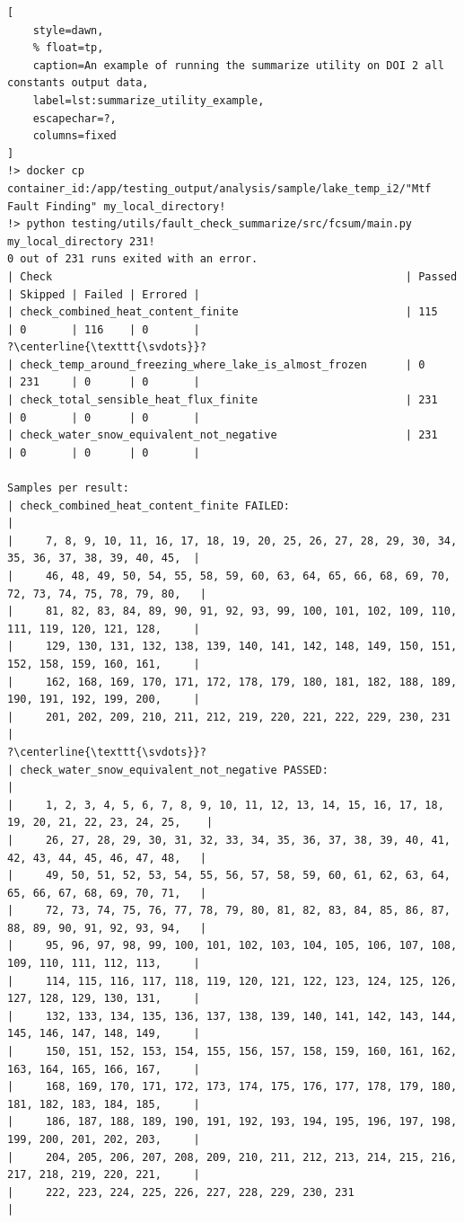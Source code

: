 \documentclass[10pt]{article}
\DeclareRobustCommand{\svdots}{%
  \vbox{
    \baselineskip=0.33333\normalbaselineskip
    \lineskiplimit=0pt
    \hbox{.}\hbox{.}\hbox{.}
    \kern-0.2\baselineskip
  }
}
\begin{document}
\begin{lstlisting}[
    style=dawn,
    % float=tp,
    caption=An example of running the summarize utility on DOI 2 all constants output data,
    label=lst:summarize_utility_example,
    escapechar=?,
    columns=fixed
]
!> docker cp container_id:/app/testing_output/analysis/sample/lake_temp_i2/"Mtf Fault Finding" my_local_directory!
!> python testing/utils/fault_check_summarize/src/fcsum/main.py my_local_directory 231!
0 out of 231 runs exited with an error.
| Check                                                       | Passed | Skipped | Failed | Errored |
| check_combined_heat_content_finite                          | 115    | 0       | 116    | 0       |
?\centerline{\texttt{\svdots}}?
| check_temp_around_freezing_where_lake_is_almost_frozen      | 0      | 231     | 0      | 0       |
| check_total_sensible_heat_flux_finite                       | 231    | 0       | 0      | 0       |
| check_water_snow_equivalent_not_negative                    | 231    | 0       | 0      | 0       |

Samples per result:
| check_combined_heat_content_finite FAILED:                                                        |
|     7, 8, 9, 10, 11, 16, 17, 18, 19, 20, 25, 26, 27, 28, 29, 30, 34, 35, 36, 37, 38, 39, 40, 45,  |
|     46, 48, 49, 50, 54, 55, 58, 59, 60, 63, 64, 65, 66, 68, 69, 70, 72, 73, 74, 75, 78, 79, 80,   |
|     81, 82, 83, 84, 89, 90, 91, 92, 93, 99, 100, 101, 102, 109, 110, 111, 119, 120, 121, 128,     |
|     129, 130, 131, 132, 138, 139, 140, 141, 142, 148, 149, 150, 151, 152, 158, 159, 160, 161,     |
|     162, 168, 169, 170, 171, 172, 178, 179, 180, 181, 182, 188, 189, 190, 191, 192, 199, 200,     |
|     201, 202, 209, 210, 211, 212, 219, 220, 221, 222, 229, 230, 231                               |
?\centerline{\texttt{\svdots}}?
| check_water_snow_equivalent_not_negative PASSED:                                                  |
|     1, 2, 3, 4, 5, 6, 7, 8, 9, 10, 11, 12, 13, 14, 15, 16, 17, 18, 19, 20, 21, 22, 23, 24, 25,    |
|     26, 27, 28, 29, 30, 31, 32, 33, 34, 35, 36, 37, 38, 39, 40, 41, 42, 43, 44, 45, 46, 47, 48,   |
|     49, 50, 51, 52, 53, 54, 55, 56, 57, 58, 59, 60, 61, 62, 63, 64, 65, 66, 67, 68, 69, 70, 71,   |
|     72, 73, 74, 75, 76, 77, 78, 79, 80, 81, 82, 83, 84, 85, 86, 87, 88, 89, 90, 91, 92, 93, 94,   |
|     95, 96, 97, 98, 99, 100, 101, 102, 103, 104, 105, 106, 107, 108, 109, 110, 111, 112, 113,     |
|     114, 115, 116, 117, 118, 119, 120, 121, 122, 123, 124, 125, 126, 127, 128, 129, 130, 131,     |
|     132, 133, 134, 135, 136, 137, 138, 139, 140, 141, 142, 143, 144, 145, 146, 147, 148, 149,     |
|     150, 151, 152, 153, 154, 155, 156, 157, 158, 159, 160, 161, 162, 163, 164, 165, 166, 167,     |
|     168, 169, 170, 171, 172, 173, 174, 175, 176, 177, 178, 179, 180, 181, 182, 183, 184, 185,     |
|     186, 187, 188, 189, 190, 191, 192, 193, 194, 195, 196, 197, 198, 199, 200, 201, 202, 203,     |
|     204, 205, 206, 207, 208, 209, 210, 211, 212, 213, 214, 215, 216, 217, 218, 219, 220, 221,     |
|     222, 223, 224, 225, 226, 227, 228, 229, 230, 231                                              |
\end{lstlisting}
\end{document}
